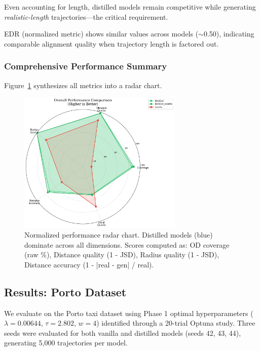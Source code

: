 Even accounting for length, distilled models remain competitive while generating \emph{realistic-length} trajectories—the critical requirement.

EDR (normalized metric) shows similar values across models ($\sim$0.50), indicating comparable alignment quality when trajectory length is factored out.

\subsubsection{Comprehensive Performance Summary}

Figure~\ref{fig:performance-radar} synthesizes all metrics into a radar chart.

\begin{figure}[h]
    \centering
    \includegraphics[width=0.7\textwidth]{assets/plots/hoser/performance_radar.pdf}
    \caption{Normalized performance radar chart. Distilled models (blue) dominate across all dimensions. Scores computed as: OD coverage (raw \%), Distance quality (1 - JSD), Radius quality (1 - JSD), Distance accuracy (1 - |real - gen| / real).}
    \label{fig:performance-radar}
\end{figure}

\subsection{Results: Porto Dataset}
\label{sec:eval-porto}

We evaluate on the Porto taxi dataset using Phase 1 optimal hyperparameters ($\lambda=0.00644$, $\tau=2.802$, $w=4$) identified through a 20-trial Optuna study. Three seeds were evaluated for both vanilla and distilled models (seeds 42, 43, 44), generating 5,000 trajectories per model.

